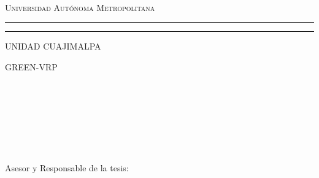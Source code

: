 \documentclass[12pt,titlepage,twoside,openright]{book}
\newcommand{\uamlogo}[3][2pt]{
    \psset{unit=#2,linewidth=#1 }
    \psline*[linearc=.25,linecolor=#3](2.8,2)(2,2)(1.8,0)(2.8,2)(3.8,0)(3.6,2)(2,2)(1.8,0)
    \psline*[linecolor=#3](0,0)(.8,0)(1.8,2)(1,2)(0,0)
    \psline*[linecolor=#3](4.8,0)(3.8,2)(4.6,2)(5.6,0)(4.8,0)
    \psline*[linearc=.25,linecolor=#3](3.8,0)(2.8,2)(3.6,2)(4.6,0)(3.8,0)
    \psline*[linearc=.25,linecolor=#3](4.6,0)(3.8,0)(2.8,2)(3.6,2)(4.6,0)
    \rput{180}(5.6,2){%
    \psline*[linearc=.25,linecolor=white](2.8,2)(2,2)(1.8,0)(2.8,2)(3.8,0)(3.6,2)(2,2)(1.8,0)
    \psline*[linearc=.25,linecolor=white](1,0)(1.8,0)(2.8,2)(2,2)(1,0)
    \psline*[linearc=.25,linecolor=white](1.8,0)(1,0)(2,2)(2.8,2)(1.8,0)
    \psline*[linearc=.25,linecolor=white](3.8,0)(2.8,2)(3.6,2)(4.6,0)(3.8,0)
    \psline*[linearc=.25,linecolor=white](4.6,0)(3.8,0)(2.8,2)(3.6,2)(4.6,0)
    \psline[linearc=.25,linecolor=#3](1,0)(2,2)(3.6,2)(4.6,0)
    \psline[linecolor=#3](1,0)(1.8,0)
    \psline[linearc=.25,linecolor=#3](4.6,0)(3.8,0)
    \psline[linearc=.25,linecolor=#3](1.8,0)(2.8,2)(3.8,0)}
    \psline*[linearc=.25,linecolor=#3](1,0)(1.8,0)(2.8,2)(2,2)(1,0)
    \psline*[linearc=.25,linecolor=#3](1.8,0)(1,0)(2,2)(2.8,2)(1.8,0)}
\begin{document}


\thispagestyle{empty}

\hskip-1.5cm
\begin{minipage}[c][5cm][s]{4cm}
	\begin{center}


		\hskip2pt \vrule width2pt height16cm\hskip1mm
		\vrule width1pt height16cm\\[10pt]

	\end{center}
\end{minipage}\quad
\begin{minipage}[c][9.5cm][s]{10cm}
	\begin{center}
		{\Large \scshape Universidad Aut\'onoma Metropolitana}
		\vspace{.3cm}
		\hrule height2pt
		\vspace{.1cm}
		\hrule height1pt
		\vspace{.3cm}
		{ UNIDAD CUAJIMALPA}


		\vspace{2cm}

		{\Large \textsc{GREEN-VRP}}

		\vspace{2cm}
		\\[8pt]


		\\[3pt]
		\elnombre\\
		\vspace{.5cm}
		{\textsc {\large \lacarrera}}\\[3pt]
		\\[13pt]
		\\[13pt]


		\vspace{2cm}

		{ Asesor y Responsable de la tesis:\\ \eldirector\\}

		\vspace{2cm}
		\begin{flushright}
			\lafecha
		\end{flushright}

	\end{center}
\end{minipage}
\end{document}
